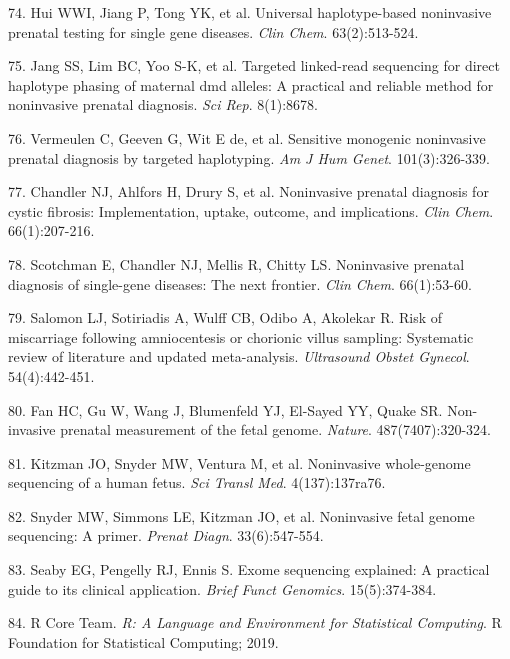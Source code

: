 \documentclass[11pt,letterpaper]{book}
\begin{document}
\leavevmode\hypertarget{ref-hui:2017aa}{}%
74. Hui WWI, Jiang P, Tong YK, et al. Universal haplotype-based noninvasive prenatal testing for single gene diseases. \emph{Clin Chem}. 63(2):513-524.

\leavevmode\hypertarget{ref-jang:2018aa}{}%
75. Jang SS, Lim BC, Yoo S-K, et al. Targeted linked-read sequencing for direct haplotype phasing of maternal dmd alleles: A practical and reliable method for noninvasive prenatal diagnosis. \emph{Sci Rep}. 8(1):8678.

\leavevmode\hypertarget{ref-vermeulen:2017aa}{}%
76. Vermeulen C, Geeven G, Wit E de, et al. Sensitive monogenic noninvasive prenatal diagnosis by targeted haplotyping. \emph{Am J Hum Genet}. 101(3):326-339.

\leavevmode\hypertarget{ref-chandler:2020aa}{}%
77. Chandler NJ, Ahlfors H, Drury S, et al. Noninvasive prenatal diagnosis for cystic fibrosis: Implementation, uptake, outcome, and implications. \emph{Clin Chem}. 66(1):207-216.

\leavevmode\hypertarget{ref-scotchman:2020aa}{}%
78. Scotchman E, Chandler NJ, Mellis R, Chitty LS. Noninvasive prenatal diagnosis of single-gene diseases: The next frontier. \emph{Clin Chem}. 66(1):53-60.

\leavevmode\hypertarget{ref-salomon:2019aa}{}%
79. Salomon LJ, Sotiriadis A, Wulff CB, Odibo A, Akolekar R. Risk of miscarriage following amniocentesis or chorionic villus sampling: Systematic review of literature and updated meta-analysis. \emph{Ultrasound Obstet Gynecol}. 54(4):442-451.

\leavevmode\hypertarget{ref-fan:2012aa}{}%
80. Fan HC, Gu W, Wang J, Blumenfeld YJ, El-Sayed YY, Quake SR. Non-invasive prenatal measurement of the fetal genome. \emph{Nature}. 487(7407):320-324.

\leavevmode\hypertarget{ref-kitzman:2012aa}{}%
81. Kitzman JO, Snyder MW, Ventura M, et al. Noninvasive whole-genome sequencing of a human fetus. \emph{Sci Transl Med}. 4(137):137ra76.

\leavevmode\hypertarget{ref-snyder:2013aa}{}%
82. Snyder MW, Simmons LE, Kitzman JO, et al. Noninvasive fetal genome sequencing: A primer. \emph{Prenat Diagn}. 33(6):547-554.

\leavevmode\hypertarget{ref-seaby:2016aa}{}%
83. Seaby EG, Pengelly RJ, Ennis S. Exome sequencing explained: A practical guide to its clinical application. \emph{Brief Funct Genomics}. 15(5):374-384.

\leavevmode\hypertarget{ref-r-core-team:2019aa}{}%
84. R Core Team. \emph{R: A Language and Environment for Statistical Computing}. R Foundation for Statistical Computing; 2019.
\end{document}

